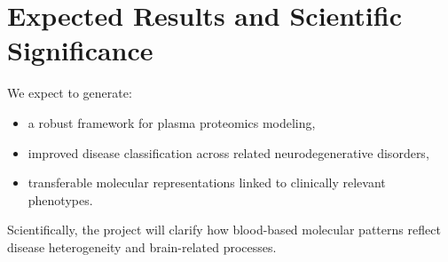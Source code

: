 \section{Expected Results and Scientific Significance}

We expect to generate:
\begin{itemize}
  \item a robust framework for plasma proteomics modeling,
  \item improved disease classification across related
    neurodegenerative disorders,
  \item transferable molecular representations linked to clinically
    relevant phenotypes.
\end{itemize}

Scientifically, the project will clarify how blood-based molecular
patterns reflect disease heterogeneity and brain-related processes.
